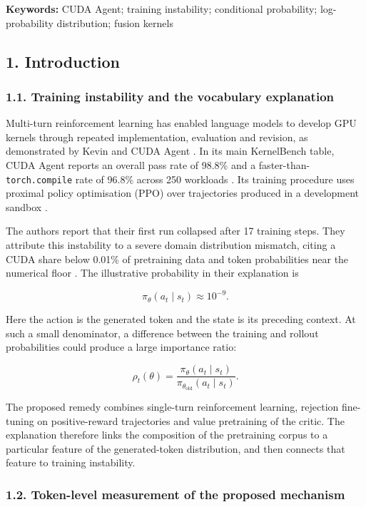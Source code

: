 \documentclass[
  11pt,
]{article}
\begin{document}
\textbf{Keywords:} CUDA Agent; training instability; conditional
probability; log-probability distribution; fusion kernels

\hypertarget{introduction}{%
\subsection{1. Introduction}\label{introduction}}

\hypertarget{the-claim}{%
\subsubsection{1.1. Training instability and the vocabulary
explanation}\label{the-claim}}

Multi-turn reinforcement learning has enabled language models to develop
GPU kernels through repeated implementation, evaluation and revision, as
demonstrated by Kevin and CUDA Agent \citep{kevin, cudaagent}. In its
main KernelBench table, CUDA Agent reports an overall pass rate of
98.8\% and a faster-than-\texttt{torch.compile} rate of 96.8\% across
250 workloads \citep{cudaagent, kernelbench}. Its training procedure
uses proximal policy optimisation (PPO) over trajectories produced in a
development sandbox \citep{cudaagent, ppo}.

The authors report that their first run collapsed after 17 training
steps. They attribute this instability to a severe domain distribution
mismatch, citing a CUDA share below 0.01\% of pretraining data and token
probabilities near the numerical floor \citep{cudaagent}. The
illustrative probability in their explanation is

\[
\pi_\theta(a_t\mid s_t)\approx10^{-9}.
\]

Here the action is the generated token and the state is its preceding
context. At such a small denominator, a difference between the training
and rollout probabilities could produce a large importance ratio:

\[
\rho_t(\theta)=\frac{\pi_\theta(a_t\mid s_t)}
{\pi_{\theta_{\mathrm{old}}}(a_t\mid s_t)}.
\]

The proposed remedy combines single-turn reinforcement learning,
rejection fine-tuning on positive-reward trajectories and value
pretraining of the critic. The explanation therefore links the
composition of the pretraining corpus to a particular feature of the
generated-token distribution, and then connects that feature to training
instability.

\hypertarget{selection-of-the-second-link}{%
\subsubsection{1.2. Token-level measurement of the proposed
mechanism}\label{selection-of-the-second-link}}
\end{document}
